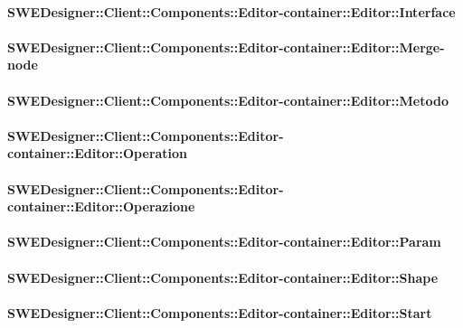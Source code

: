 			\paragraph{SWEDesigner::Client::Components::Editor-container::Editor::Interface}
				
				
			\paragraph{SWEDesigner::Client::Components::Editor-container::Editor::Merge-node}
				
				
			\paragraph{SWEDesigner::Client::Components::Editor-container::Editor::Metodo}
				
				
			\paragraph{SWEDesigner::Client::Components::Editor-container::Editor::Operation}
				
				
			\paragraph{SWEDesigner::Client::Components::Editor-container::Editor::Operazione}
				
				
			\paragraph{SWEDesigner::Client::Components::Editor-container::Editor::Param}
				
				
			\paragraph{SWEDesigner::Client::Components::Editor-container::Editor::Shape}
				
				
			\paragraph{SWEDesigner::Client::Components::Editor-container::Editor::Start}
				
				
